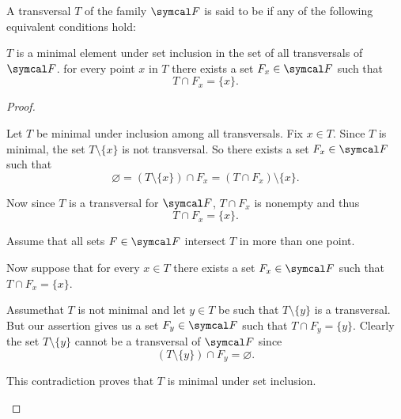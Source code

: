 \begin{definition}\label{def:minimal_set_transversal}\cite[89]{Lectures:logic_programming}
  A transversal \( T \) of the family \( \Cal{F} \) is said to be  if any of the following equivalent conditions hold:
  \begin{defenum}
     \( T \) is a minimal element under set inclusion in the set of all transversals of \( \Cal{F} \).
     for every point \( x \) in \( T \) there exists a set \( F_x \in \Cal{F} \) such that
    \begin{equation*}
      T \cap F_x = \{ x \}.
    \end{equation*}
  \end{defenum}
\end{definition}
\begin{proof}
  \begin{description}
     Let \( T \) be minimal under inclusion among all transversals. Fix \( x \in T \). Since \( T \) is minimal, the set \( T \setminus \{ x \} \) is not transversal. So there exists a set \( F_x \in \Cal{F} \) such that
    \begin{equation*}
      \varnothing = (T \setminus \{ x \}) \cap F_x = (T \cap F_x) \setminus \{ x \}.
    \end{equation*}

    Now since \( T \) is a transversal for \( \Cal{F} \), \( T \cap F_x \) is nonempty and thus
    \begin{equation*}
      T \cap F_x = \{ x \}.
    \end{equation*}

    Assume that all sets \( F \in \Cal{F} \) intersect \( T \) in more than one point.

     Now suppose that for every \( x \in T \) there exists a set \( F_x \in \Cal{F} \) such that \( T \cap F_x = \{ x \} \).

    Assume\LEM that \( T \) is not minimal and let \( y \in T \) be such that \( T \setminus \{ y \} \) is a transversal. But our assertion gives us a set \( F_y \in \Cal{F} \) such that \( T \cap F_y = \{ y \} \). Clearly the set \( T \setminus \{ y \} \) cannot be a transversal of \( \Cal{F} \) since
    \begin{equation*}
      (T \setminus \{ y \}) \cap F_y = \varnothing.
    \end{equation*}

    This contradiction proves that \( T \) is minimal under set inclusion.
  \end{description}
\end{proof}

